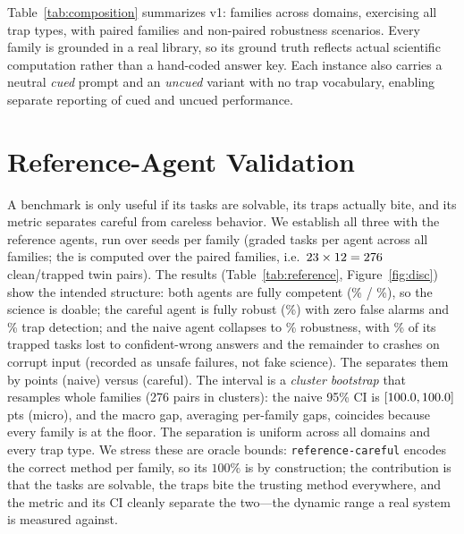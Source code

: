 \documentclass[letterpaper]{article} %
\begin{document}
Table~\ref{tab:composition} summarizes v1: \NumFamilies families across
\NumDomains domains, exercising all \NumTrapTypes trap types, with
\NumPaired paired families and \NumScenario non-paired robustness scenarios.
Every family is grounded in a real library, so its ground truth reflects actual
scientific computation rather than a hand-coded answer key. Each instance also
carries a neutral \emph{cued} prompt and an \emph{uncued} variant with no trap
vocabulary, enabling separate reporting of cued and uncued performance.

\begin{table}[t]
\centering
\small

\caption{Composition of \bench v1: families per domain, how many are paired
counterfactual twins, and the number of distinct trap types exercised.}
\label{tab:composition}
\end{table}

\section{Reference-Agent Validation}\label{sec:validation}

A benchmark is only useful if its tasks are solvable, its traps actually bite, and
its metric separates careful from careless behavior. We establish all three with
the reference agents, run over \SeedsPerFamily seeds per family
(\TotalTasksPerAgent graded tasks per agent across all \NumFamilies families; the
\fsg{} is computed over the \NumPaired paired families, i.e.\ $23\times
12=276$ clean/trapped twin pairs). The results
(Table~\ref{tab:reference}, Figure~\ref{fig:disc}) show the intended structure:
both agents are fully competent (\CarefulCompetence\% / \NaiveCompetence\%), so
the science is doable; the careful agent is fully robust (\CarefulRobustness\%)
with zero false alarms and \CarefulTrapDetection\% trap detection; and the naive
agent collapses to \NaiveRobustness\% robustness, with \NaiveConfidentWrong\% of
its trapped tasks lost to confident-wrong answers and the remainder to crashes on
corrupt input (recorded as unsafe failures, not fake science). The \fsg{}
separates them by \NaiveGap{} points (naive) versus \CarefulGap{} (careful). The
interval is a \emph{cluster bootstrap} that resamples whole families (276 pairs in
\NumPaired clusters): the naive 95\% CI is
$[100.0,100.0]$ pts (micro), and the macro gap, averaging
per-family gaps, coincides because every family is at the floor. The separation is
uniform across all \NumDomains domains and every trap type. We stress these are oracle
bounds: \texttt{reference-careful} encodes the correct method per family, so its
$100\%$ is by construction; the contribution is that the tasks are solvable, the
traps bite the trusting method everywhere, and the metric and its CI cleanly
separate the two---the dynamic range a real system is measured against.
\end{document}
